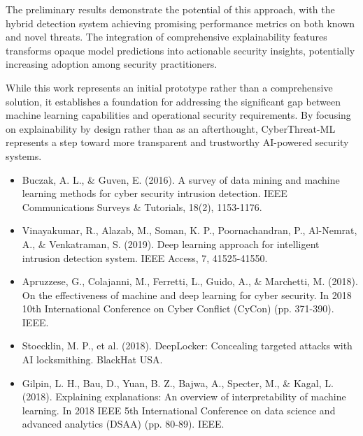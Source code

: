 \documentclass[12pt]{article}
\begin{document}
The preliminary results demonstrate the potential of this approach, with the hybrid detection system achieving promising performance metrics on both known and novel threats. The integration of comprehensive explainability features transforms opaque model predictions into actionable security insights, potentially increasing adoption among security practitioners.

While this work represents an initial prototype rather than a comprehensive solution, it establishes a foundation for addressing the significant gap between machine learning capabilities and operational security requirements. By focusing on explainability by design rather than as an afterthought, CyberThreat-ML represents a step toward more transparent and trustworthy AI-powered security systems.

\begin{itemize}
\item Buczak, A. L., & Guven, E. (2016). A survey of data mining and machine learning methods for cyber security intrusion detection. IEEE Communications Surveys & Tutorials, 18(2), 1153-1176.
\end{itemize}

\begin{itemize}
\item Vinayakumar, R., Alazab, M., Soman, K. P., Poornachandran, P., Al-Nemrat, A., & Venkatraman, S. (2019). Deep learning approach for intelligent intrusion detection system. IEEE Access, 7, 41525-41550.
\end{itemize}

\begin{itemize}
\item Apruzzese, G., Colajanni, M., Ferretti, L., Guido, A., & Marchetti, M. (2018). On the effectiveness of machine and deep learning for cyber security. In 2018 10th International Conference on Cyber Conflict (CyCon) (pp. 371-390). IEEE.
\end{itemize}

\begin{itemize}
\item Stoecklin, M. P., et al. (2018). DeepLocker: Concealing targeted attacks with AI locksmithing. BlackHat USA.
\end{itemize}

\begin{itemize}
\item Gilpin, L. H., Bau, D., Yuan, B. Z., Bajwa, A., Specter, M., & Kagal, L. (2018). Explaining explanations: An overview of interpretability of machine learning. In 2018 IEEE 5th International Conference on data science and advanced analytics (DSAA) (pp. 80-89). IEEE.
\end{itemize}
\end{document}
